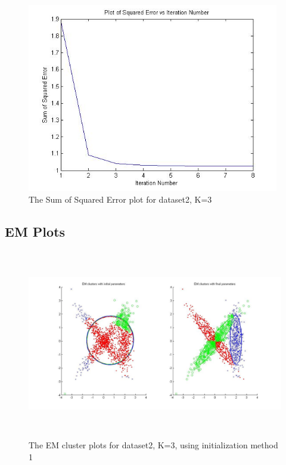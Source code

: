 \documentclass[11pt,psfig]{article}
\begin{document}
\begin{figure}[H]
\centering
\includegraphics[height=3.25in]{dataset2_kMeans_squaredErrorPlot.jpg}
\caption{The Sum of Squared Error plot for dataset2, K=3}
\end{figure}

\subsection{EM Plots}

\begin{figure}[H]
\centering
\includegraphics[height=3.25in]{dataset2_EMclusterPlots.jpg}
\caption{The EM cluster plots for dataset2, K=3, using initialization method 1}
\end{figure}
\end{document}

